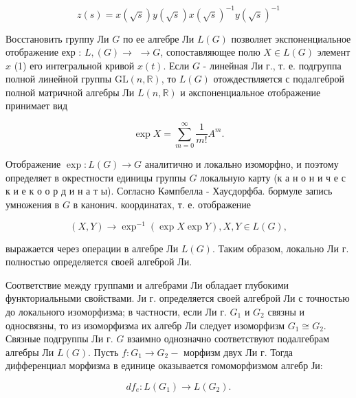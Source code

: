 \documentclass[10pt]{article}
\begin{document}
\[

z(s)=x(\sqrt{s}) y(\sqrt{s}) x(\sqrt{s})^{-1} y(\sqrt{s})^{-1}

\]



Восстановить группу Ли $G$ по ее алгебре Ли $L(G)$ позволяет экспоненциальное отображение ехр : $L,(G) \rightarrow$ $\rightarrow G$, сопоставляющее полю $X \in L(G)$ элемент $x$ (1) его интегральной кривой $x(t)$. Если $G$ - линейная Ли г., т. е. подгруппа полной линейной группы $\mathrm{GL}(n, \mathbb{R})$, то $L(G)$ отождествляется с подалгеброй полной матричной алгебры Ли $L(n, \mathbb{R})$ и әкспоненциальное отображение принимает вид



\[

\exp X=\sum_{m=0}^{\infty} \frac{1}{m !} A^{m} .

\]



Отображение $\exp : L(G) \rightarrow G$ аналитично и локально изоморфно, и поэтому определяет в окрестности единицы группы $G$ локальную карту (к а н о н и ч е с к и е к о о р д и н а т ы). Согласно Кәмпбелла - Хаусдорфба. бормуле запись умножения в $G$ в канонич. координатах, т. е. отображение



\[

(X, Y) \longrightarrow \exp ^{-1}(\exp X \exp Y), X, Y \in L(G),

\]



выражается через операции в алгебре Ли $L(G)$. Таким образом, локально Ли г. полностыо определяется своей алгеброй Ли.



Соответствие между группами и алгебрами Ли обладает глубокими функториальными свойствами. Ји г. определяется своей алгеброй Ли с точностью до локального изоморфизма; в частности, если Ли г. $G_{1}$ и $G_{2}$ связны и односвязны, то из изоморфизма их алгебр Ли следует изоморфизм $G_{1} \cong G_{2}$. Связные подгруппы Ли г. $G$ взаимно однозначно соответствуют подалгебрам алгебры Ли $L(G)$. Пусть $f: G_{1} \rightarrow G_{2}-$ морфизм двух Ли г. Тогда дифференциал морфизма в единице оказывается гомоморфизмом алгебр Ји:



\[

d f_{e}: L\left(G_{1}\right) \rightarrow L\left(G_{2}\right) .

\]
\end{document}
